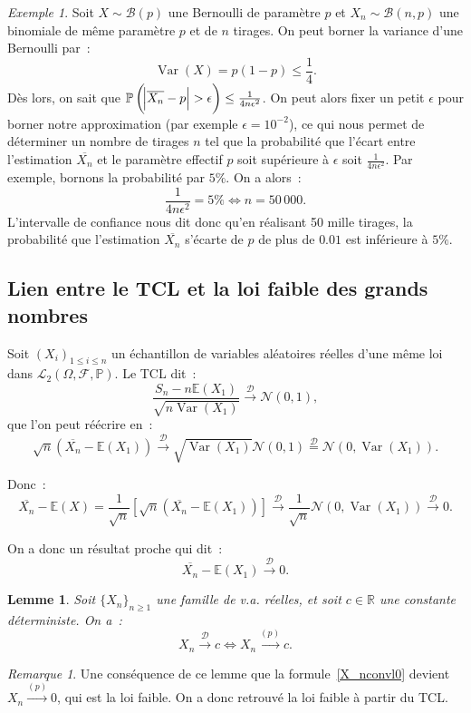 \documentclass{article}
\newcommand{\E}{\mathbb E}
\renewcommand{\P}{\mathbb P}
\newcommand{\R}{\mathbb R}
\newcommand{\Nzu}{\mathcal N(0, 1)}  %
\newcommand{\convl}{\stackrel{\mathcal D}\to}  %
\newcommand{\espproba}[3]{\left(#1, #2, #3\right)}  %
\newcommand{\Ofp}{\espproba \Omega{\mathcal F}\P}  %
\newcommand{\Ld}{\mathcal L_2\Ofp}  %
\newcommand{\Ces}{\overline}  %
\newcommand{\convp}{\stackrel {(p)}\to}  %
\DeclareMathOperator{\Var}{Var}
\newtheorem{lem}[thm]{Lemme}
\theoremstyle{definition}
\theoremstyle{remark}
\newtheorem*{rmq}{Remarque}
\newtheorem{ex}{Exemple}
\begin{document}
		\begin{ex} Soit $X \sim \mathcal B(p)$ une Bernoulli de paramètre $p$ et $X_n \sim \mathcal B(n, p)$ une binomiale de même paramètre $p$ et de $n$ tirages.
		On peut borner la variance d'une Bernoulli par~:
		\[\Var(X) = p(1-p) \leq \frac 14.\]
		Dès lors, on sait que $\P\left(\abs {\Ces {X_n} - p} > \epsilon\right) \leq \frac 1{4n\epsilon^2}$. On peut alors fixer un petit $\epsilon$
		pour borner notre approximation (par exemple $\epsilon = 10^{-2}$), ce qui nous permet de déterminer un nombre de tirages $n$ tel que la probabilité
		que l'écart entre l'estimation $\Ces {X_n}$ et le paramètre effectif $p$ soit supérieure à $\epsilon$ soit $\frac 1{4n\epsilon^2}$. Par exemple, bornons
		la probabilité par $5\%$. On a alors~:
		\[\frac 1{4n\epsilon^2} = 5\% \iff n = 50\,000.\]
		L'intervalle de confiance nous dit donc qu'en réalisant 50 mille tirages, la probabilité que l'estimation $\Ces {X_n}$ s'écarte de $p$ de plus de $0.01$
		est inférieure à $5\%$.
		\end{ex}

	\subsection{Lien entre le TCL et la loi faible des grands nombres}
		Soit $(X_i)_{1 \leq i \leq n}$ un échantillon de variables aléatoires réelles d'une même loi dans $\Ld$. Le TCL dit~:
		\[\frac {S_n - n\E(X_1)}{\sqrt {n\Var(X_1)}} \convl \Nzu,\]
		que l'on peut réécrire en~:
		\[\sqrt n\left(\Ces {X_n} - \E(X_1)\right) \convl \sqrt {\Var(X_1)}\Nzu \stackrel {\mathcal D}= \mathcal N(0, \Var(X_1)).\]

		Donc~:
		\[\Ces {X_n} - \E(X) = \frac 1{\sqrt n}\left[\sqrt n\left(\Ces {X_n} - \E(X_1)\right)\right] \convl \frac 1{\sqrt n}\mathcal N(0, \Var(X_1)) \convl 0.\]

		On a donc un résultat proche qui dit~:
		\begin{equation}\label{X_nconvl0}
			\Ces {X_n} - \E(X_1) \convl 0.
		\end{equation}

		\begin{lem} Soit $\{X_n\}_{n \geq 1}$ une famille de v.a. réelles, et soit $c \in \R$ une constante déterministe. On a~:
		\[X_n \convl c \iff X_n \convp c.\]
		\end{lem}

		\begin{rmq} Une conséquence de ce lemme que la formule~\eqref{X_nconvl0} devient $X_n \convp 0$, qui est la loi faible. On a donc retrouvé la loi
		faible à partir du TCL. \end{rmq}
\end{document}
